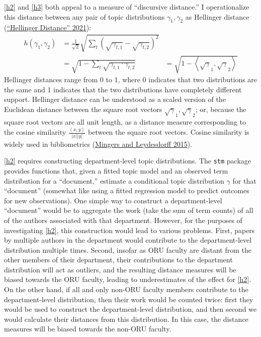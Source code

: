 \documentclass[
  11pt,
]{article}
\begin{document}
\ref{h2} and \ref{h3} both appeal to a measure of ``discursive distance.'' I operationalize this distance between any pair of topic distributions \(\gamma_1, \gamma_2\) as Hellinger distance (\protect\hyperlink{ref-HellingerDistance2021}{{``Hellinger Distance''} 2021}):\\
\begin{align*}
    h(\gamma_1, \gamma_2) &= \frac{1}{\sqrt 2} \sqrt{\sum_{t} (\sqrt{\gamma_{t,1}} - \sqrt{\gamma_{t,2}})^2}\\
    &= \sqrt{1 - \sum_t \sqrt{\gamma_{t,1} \cdot \gamma_{t,2}}}
    &= \sqrt{1 - \left<\sqrt\gamma_1, \sqrt\gamma_2\right>}
\end{align*} Hellinger distances range from 0 to 1, where 0 indicates that two distributions are the same and 1 indicates that the two distributions have completely different support. Hellinger distance can be understood as a scaled version of the Euclidean distance between the square root vectors \(\sqrt \gamma_1, \sqrt \gamma_2\); or, because the square root vectors are all unit length, as a distance measure corresponding to the cosine similarity \(\frac{\left<x, y\right>}{|x||y|}\) between the square root vectors. Cosine similarity is widely used in bibliometrics (\protect\hyperlink{ref-MingersReviewTheoryPractice2015}{Mingers and Leydesdorff 2015}).

\ref{h2} requires constructing department-level topic distributions. The \texttt{stm} package provides functions that, given a fitted topic model and an observed term distribution for a ``document,'' estimate a conditional topic distribution \(\gamma\) for that ``document'' (somewhat like using a fitted regression model to predict outcomes for new observations). One simple way to construct a department-level ``document'' would be to aggregate the work (take the sum of term counts) of all of the authors associated with that department. However, for the purposes of investigating \ref{h2}, this construction would lead to various problems. First, papers by multiple authors in the department would contribute to the department-level distribution multiple times. Second, insofar as ORU faculty are distant from the other members of their department, their contributions to the department distribution will act as outliers, and the resulting distance measures will be biased towards the ORU faculty, leading to underestimates of the effect for \ref{h2}. On the other hand, if all and only non-ORU faculty members contribute to the department-level distribution, then their work would be counted twice: first they would be used to construct the department-level distribution, and then second we would calculate their distances from this distribution. In this case, the distance measures will be biased towards the non-ORU faculty.
\end{document}
